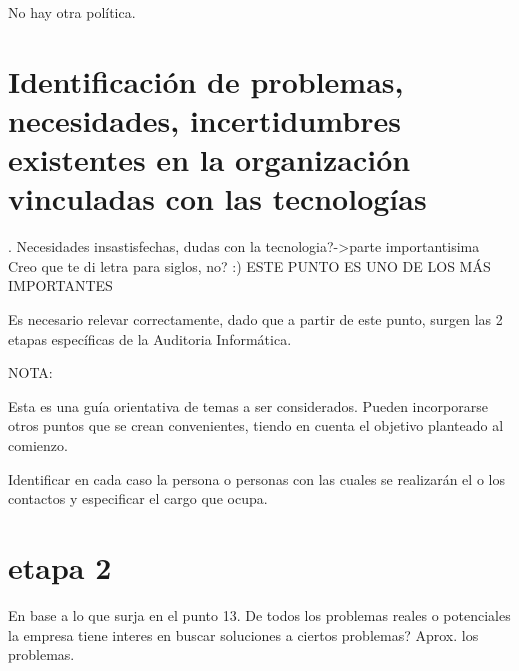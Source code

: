 \documentclass[10pt,a4paper,final]{article}
\begin{document}
          No hay otra política. 
\section{Identificación de problemas, necesidades, incertidumbres existentes en la organización vinculadas con las tecnologías}. Necesidades insastisfechas, dudas con la tecnologia?->parte importantisima
 Creo que te di letra para siglos, no? :)
 ESTE PUNTO ES UNO DE LOS MÁS IMPORTANTES

Es necesario relevar correctamente, dado que a partir de este punto, surgen las 2 etapas específicas de la Auditoria Informática.

NOTA:

Esta es una guía orientativa de temas a ser considerados. Pueden incorporarse otros puntos que se crean convenientes, tiendo en cuenta el objetivo planteado al comienzo.

Identificar en cada caso la persona o personas con las cuales se realizarán el o los contactos y especificar el cargo que ocupa.

\section{etapa 2}
En base a lo que surja en el punto 13. De todos los problemas reales o potenciales la empresa tiene interes en buscar soluciones a ciertos problemas?
Aprox. los problemas.
\end{document}
